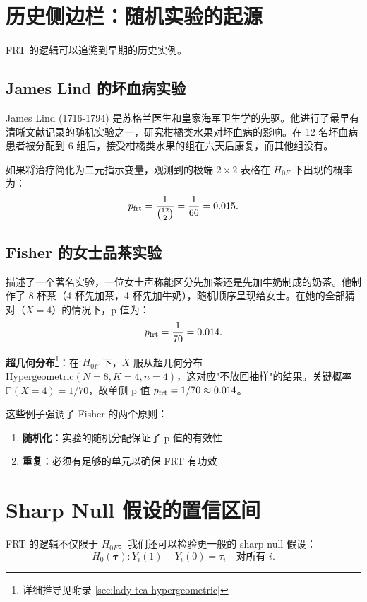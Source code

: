 \section{历史侧边栏：随机实验的起源}\label{sec:tea-history}

FRT 的逻辑可以追溯到早期的历史实例。

\subsection{James Lind 的坏血病实验}

James Lind (1716-1794) 是苏格兰医生和皇家海军卫生学的先驱。他进行了最早有清晰文献记录的随机实验之一，研究柑橘类水果对坏血病的影响。在 12 名坏血病患者被分配到 6 组后，接受柑橘类水果的组在六天后康复，而其他组没有。

如果将治疗简化为二元指示变量，观测到的极端 $2 \times 2$ 表格在 $H_{0F}$ 下出现的概率为：
\[
p_{\text{frt}} = \frac{1}{\binom{12}{2}} = \frac{1}{66} = 0.015.
\]

\subsection{Fisher 的女士品茶实验}

\citet{Fisher:1935} 描述了一个著名实验，一位女士声称能区分先加茶还是先加牛奶制成的奶茶。他制作了 8 杯茶（4 杯先加茶，4 杯先加牛奶），随机顺序呈现给女士。在她的全部猜对（$X = 4$）的情况下，p 值为：
\[
p_{\text{frt}} = \frac{1}{70} = 0.014.
\]

\textbf{超几何分布}\footnote{详细推导见附录 \cref{sec:lady-tea-hypergeometric}}：在 $H_{0F}$ 下，$X$ 服从超几何分布 $\text{Hypergeometric}(N=8, K=4, n=4)$，这对应"不放回抽样"的结果。关键概率 $\mathbb{P}(X = 4) = 1/70$，故单侧 p 值 $p_{\text{frt}} = 1/70 \approx 0.014$。

这些例子强调了 Fisher 的两个原则：
\begin{enumerate}
  \item \textbf{随机化}：实验的随机分配保证了 p 值的有效性
  \item \textbf{重复}：必须有足够的单元以确保 FRT 有功效
\end{enumerate}

\section{Sharp Null 假设的置信区间}

FRT 的逻辑不仅限于 $H_{0F}$。我们还可以检验更一般的 sharp null 假设：
\begin{equation}
H_0(\boldsymbol{\tau}): Y_i(1) - Y_i(0) = \tau_i \quad \text{对所有 } i.
\label{eq:general-sharp-null}
\end{equation}


